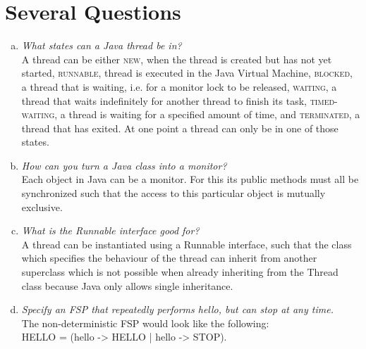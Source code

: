 \documentclass{report}
\begin{document}
	\section{Several Questions}
	\startsection
		\begin{enumerate}[a)]
			\item \textit{What states can a Java thread be in?} \\
			A thread can be either \textsc{new}, when the thread is created but has not yet started, \textsc{runnable}, thread is executed in the Java Virtual Machine, \textsc{blocked}, a thread that is waiting, i.e. for a monitor lock to be released, \textsc{waiting}, a thread that waits indefinitely for another thread to finish its task, \textsc{timed-waiting}, a thread is waiting for a specified amount of time, and \textsc{terminated}, a thread that has exited. At one point a thread can only be in one of those states. 
			\item \textit{How can you turn a Java class into a monitor?} \\
			Each object in Java can be a monitor. For this its public methods must all be synchronized such that the access to this particular object is mutually exclusive.
			\item \textit{What is the Runnable interface good for?} \\
			A thread can be instantiated using a Runnable interface, such that the class which specifies the behaviour of the thread can inherit from another superclass which is not possible when already inheriting from the Thread class because Java only allows single inheritance.
			\item \textit{Specify an FSP that repeatedly performs hello, but can stop at any time.} \\
			The non-deterministic FSP would look like the following: \\
			HELLO = (hello -> HELLO | hello -> STOP).
		\end{enumerate}
	\closesection
	
\end{document}
